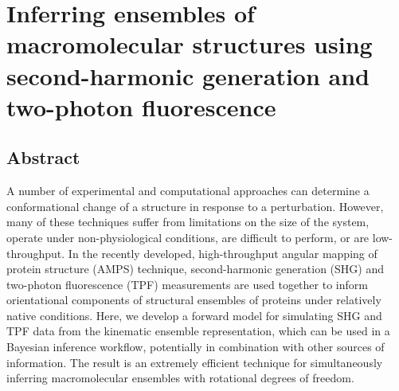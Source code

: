 \documentclass[../../main.tex]{subfiles}
\begin{document}
\chapter{Inferring ensembles of macromolecular structures using second-harmonic generation and two-photon fluorescence}
\label{shg-tpf}

\begin{refsection}

	\section{Abstract}

	A number of experimental and computational approaches can determine a conformational change of a structure in response to a perturbation.
	However, many of these techniques suffer from limitations on the size of the system, operate under non-physiological conditions, are difficult to perform, or are low-throughput.
	In the recently developed, high-throughput angular mapping of protein structure (AMPS) technique, second-harmonic generation (SHG) and two-photon fluorescence (TPF) measurements are used together to inform orientational components of structural ensembles of proteins under relatively native conditions.
	Here, we develop a forward model for simulating SHG and TPF data from the kinematic ensemble representation, which can be used in a Bayesian inference workflow, potentially in combination with other sources of information.
	The result is an extremely efficient technique for simultaneously inferring macromolecular ensembles with rotational degrees of freedom.


\end{refsection}
\end{document}
